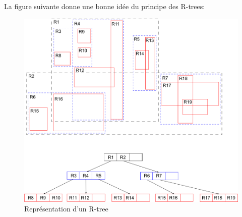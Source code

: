 \documentclass[11pt,a4paper,utf8x]{report}
\begin{document}
La figure suivante donne une bonne idée du principe des R-trees:
\begin{figure}[htbp]
\centering
\includegraphics[scale=0.50]{rtree}
\caption{Représentation d'un R-tree}
\label{fig:rtree}
\end{figure}
\end{document}
